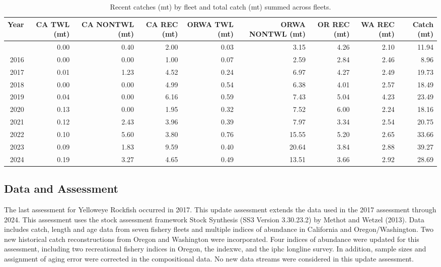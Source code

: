 \documentclass[
]{scrartcl}
\begin{document}
\begin{landscape}
\begingroup
\setlength{}
\setlength{}\fontsize{9.0pt}{10.8pt}\selectfont

\begin{longtable}{@{\extracolsep{\fill}}rrrrrrrrr}

\caption{\label{tbl-es-catches}Recent catches (mt) by fleet and total
catch (mt) summed across fleets.}

\tabularnewline

\toprule
Year & CA TWL (mt) & CA NONTWL (mt) & CA REC (mt) & ORWA TWL (mt) & ORWA NONTWL (mt) & OR REC (mt) & WA REC (mt) & Catch (mt) \\ 
\midrule\addlinespace[2.5pt]
2015 & 0.00 & 0.40 & 2.00 & 0.03 & 3.15 & 4.26 & 2.10 & 11.94 \\ 
2016 & 0.00 & 0.00 & 1.00 & 0.07 & 2.59 & 2.84 & 2.46 & 8.96 \\ 
2017 & 0.01 & 1.23 & 4.52 & 0.24 & 6.97 & 4.27 & 2.49 & 19.73 \\ 
2018 & 0.00 & 0.00 & 4.99 & 0.54 & 6.38 & 4.01 & 2.57 & 18.49 \\ 
2019 & 0.04 & 0.00 & 6.16 & 0.59 & 7.43 & 5.04 & 4.23 & 23.49 \\ 
2020 & 0.13 & 0.00 & 1.95 & 0.32 & 7.52 & 6.00 & 2.24 & 18.16 \\ 
2021 & 0.12 & 2.43 & 3.96 & 0.39 & 7.97 & 3.34 & 2.54 & 20.75 \\ 
2022 & 0.10 & 5.60 & 3.80 & 0.76 & 15.55 & 5.20 & 2.65 & 33.66 \\ 
2023 & 0.09 & 1.83 & 9.59 & 0.40 & 20.64 & 3.84 & 2.88 & 39.27 \\ 
2024 & 0.19 & 3.27 & 4.65 & 0.49 & 13.51 & 3.66 & 2.92 & 28.69 \\ 
\bottomrule

\end{longtable}

\endgroup

\end{landscape}

\clearpage

\subsection*{Data and Assessment}\label{data-and-assessment}

The last assessment for Yelloweye Rockfish occurred in 2017. This update
assessment extends the data used in the 2017 assessment through 2024.
This assessment uses the stock assessment framework Stock Synthesis (SS3
Version 3.30.23.2) by Methot and Wetzel (2013). Data includes catch,
length and age data from seven fishery fleets and multiple indices of
abundance in California and Oregon/Washington. Two new historical catch
reconstructions from Oregon and Washington were incorporated. Four
indices of abundance were updated for this assessment, including two
recreational fishery indices in Oregon, the \gls{indexwc}, and the
\gls{iphc} longline survey. In addition, sample sizes and assignment of
aging error were corrected in the compositional data. No new data
streams were considered in this update assessment.
\end{document}
